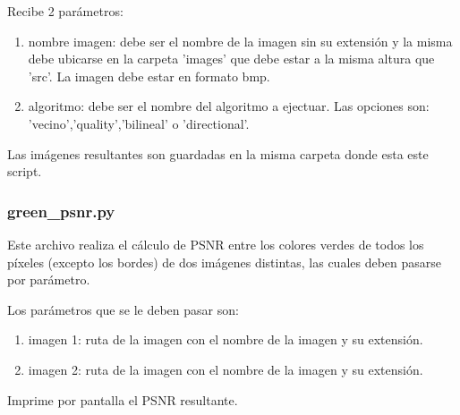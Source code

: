 Recibe 2 parámetros:
\begin{enumerate}
\item nombre imagen: debe ser el nombre de la imagen sin su extensi\'on y la misma debe ubicarse en la carpeta 'images' que debe estar a la misma altura que 'src'. La imagen debe estar en formato bmp.
\item algoritmo: debe ser el nombre del algoritmo a ejectuar. Las opciones son: 'vecino','quality','bilineal' o 'directional'.
\end{enumerate}

Las imágenes resultantes son guardadas en la misma carpeta donde esta este script.

\subsubsection{green\_psnr.py}

Este archivo realiza el cálculo de PSNR entre los colores verdes de todos los píxeles (excepto los bordes) de dos imágenes distintas, las cuales deben pasarse por parámetro.

Los parámetros que se le deben pasar son:
\begin{enumerate}
\item imagen 1: ruta de la imagen con el nombre de la imagen y su extensi\'on. 
\item imagen 2: ruta de la imagen con el nombre de la imagen y su extensi\'on.
\end{enumerate}

Imprime por pantalla el PSNR resultante.
